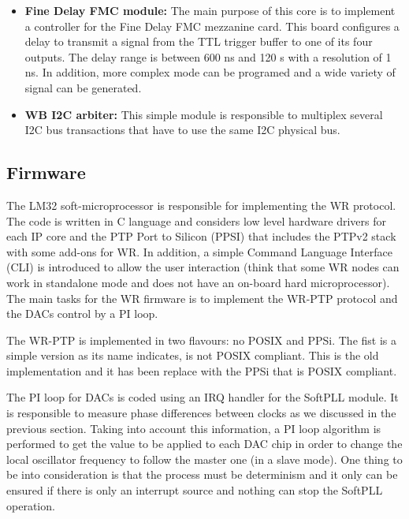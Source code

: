 \documentclass[review]{elsarticle}
\begin{document}
\begin{itemize}
{	%
	}
	\item{\textbf{Fine Delay FMC module:} The main purpose of this core is to implement a controller for the Fine Delay FMC mezzanine card. This board configures a delay to transmit a signal from the TTL trigger buffer to one of its four outputs. The delay range is between 600 ns and 120 s with a resolution of 1 ns. In addition, more complex mode can be programed and a wide variety of signal can be generated.}
	\item{\textbf{WB I2C arbiter:} This simple module is responsible to multiplex several I2C bus transactions that have to use the same I2C physical bus.}
\end{itemize}

\subsection{Firmware}

The LM32 soft-microprocessor is responsible for implementing the WR protocol. The code is written in C language and considers low level hardware drivers for each IP core and the PTP Port to Silicon (PPSI) that includes the PTPv2 stack with some add-ons for WR. In addition, a simple Command Language Interface (CLI) is introduced to allow the user interaction (think that some WR nodes can work in standalone mode and does not have an on-board hard microprocessor). The main tasks for the WR firmware is to implement the WR-PTP protocol and the DACs control by a PI loop. 

The WR-PTP is implemented in two flavours: no POSIX and PPSi. The fist is a simple version as its name indicates, is not POSIX compliant. This is the old implementation and it has been replace with the PPSi that is POSIX compliant.

The PI loop for DACs is coded using an IRQ handler for the SoftPLL module. It is responsible to measure phase differences between clocks as we discussed in the previous section. Taking into account this information, a PI loop algorithm is performed to get the value to be applied to each DAC chip in order to change the local oscillator frequency to follow the master one (in a slave mode). One thing to be into consideration is that the process must be determinism and it only can be ensured if there is only an interrupt source and nothing can stop the SoftPLL operation.
\end{document}
